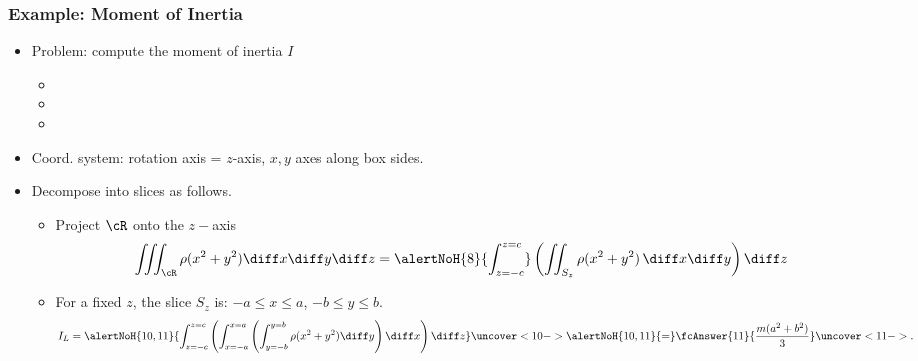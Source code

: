\begin{frame}
\frametitle{Example: Moment of Inertia}
\begin{itemize}
\item Problem: compute the moment of inertia $I$
\begin{itemize}
\item {}
\item {}
\item {} 
\end{itemize}
\item<5-> Coord. system: rotation axis = $z$-axis, $x,y$ axes along box sides.
\item<7-> Decompose into slices as follows.
\begin{itemize}
\item<7-> Project $\cR$ onto the $z-$axis 
\[
\iiint_{\cR} \rho (x^2+y^2) \diff x \diff y \diff z = \alertNoH{8}{\int_{z=-c}^{z=c}} \left( \iint_{S_z} \rho (x^2+y^2)\, \diff x \diff y \right) \diff z
\]
\item<9-> For a fixed $z$, the slice $S_z$ is: $-a \leq x \leq a$, $-b \leq  y \leq  b$.
\[
I_L = \alertNoH{10,11}{ \int_{z=-c}^{z=c} \left(\int_{x=-a}^{x=a} \left( \int_{y=-b}^{y=b} \rho (x^2+y^2)  \diff y \right)  \diff x\right)  \diff z} \uncover<10->{\alertNoH{10,11}{=}} \fcAnswer{11}{\frac{m(a^2+b^2)}{3}} \uncover<11->{.}
\]
%

\end{itemize}
  \end{itemize}
\end{frame}
